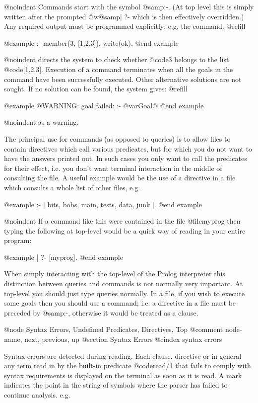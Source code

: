 @noindent
Commands start with the symbol @samp{:-}.  (At top level this is simply
written after the prompted @w{@samp{| ?- }} which is then effectively
overridden.)  Any required output must be programmed explicitly; e.g. the
command: @refill

@example
:- member(3, [1,2,3]), write(ok).
@end example

@noindent
directs the system to check whether @code{3} belongs to the list
@code{[1,2,3]}.  Execution of a command terminates when all the goals in
the command have been successfully executed.  Other alternative solutions
are not sought.  If no solution can be found, the system gives: @refill

@example
@{WARNING: goal failed: :- @var{Goal}@}
@end example

@noindent
as a warning.

The principal use for commands (as opposed to queries) is to allow files
to contain directives which call various predicates, but for which you do
not want to have the answers printed out.  In such cases you only want to
call the predicates for their effect, i.e. you don't want terminal
interaction in the middle of consulting the file.  A useful example would
be the use of a directive in a file which consults a whole list of other
files, e.g.

@example
:- [ bits, bobs, main, tests, data, junk ].
@end example

@noindent
If a command like this were contained in the file @file{myprog} then typing
the following at top-level would be a quick way of reading in your entire
program:

@example
| ?- [myprog].
@end example

When simply interacting with the top-level of the Prolog interpreter this
distinction between queries and commands is not normally very important.
At top-level you should just type queries normally.  In a file, if you
wish to execute some goals then you should use a command; i.e. a directive
in a file must be preceded by @samp{:-}, otherwise it would be treated as a
clause.

@node Syntax Errors, Undefined Predicates, Directives, Top
@comment  node-name,  next,  previous,  up
@section Syntax Errors
@cindex syntax errors

Syntax errors are detected during reading.  Each clause, directive or in
general any term read in by the built-in predicate @code{read/1} that
fails to comply with syntax requirements is displayed on the terminal as
soon as it is read.  A mark indicates the point in the string of symbols
where the parser has failed to continue analysis.  e.g.

